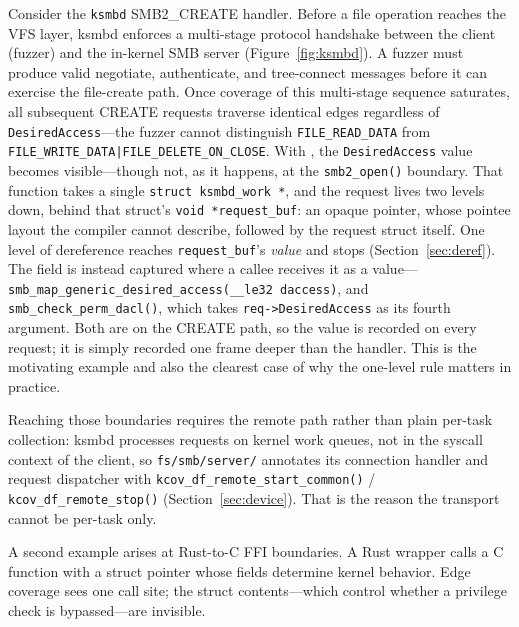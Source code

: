 \documentclass{article}
\begin{document}
Consider the \texttt{ksmbd} SMB2\_CREATE handler. Before a file operation
reaches the VFS layer, ksmbd enforces a multi-stage protocol handshake
between the client (fuzzer) and the in-kernel SMB server
(Figure~\ref{fig:ksmbd}). A fuzzer must produce valid negotiate, authenticate,
and tree-connect messages before it can exercise the file-create path. Once
coverage of this multi-stage sequence saturates, all subsequent CREATE requests
traverse identical edges regardless of \texttt{DesiredAccess}---the fuzzer
cannot distinguish \texttt{FILE\_READ\_DATA} from
\texttt{FILE\_WRITE\_DATA|FILE\_DELETE\_ON\_CLOSE}. With \toolname{}, the
\texttt{DesiredAccess} value becomes visible---though not, as it happens, at
the \texttt{smb2\_open()} boundary. That function takes a single
\texttt{struct ksmbd\_work *}, and the request lives two levels down, behind
that struct's \texttt{void *request\_buf}: an opaque pointer, whose pointee
layout the compiler cannot describe, followed by the request struct itself.
One level of dereference reaches \texttt{request\_buf}'s \emph{value} and stops
(Section~\ref{sec:deref}). The field is instead captured where a callee
receives it as a value---\texttt{smb\_map\_generic\_desired\_access(\_\_le32
daccess)}, and \texttt{smb\_check\_perm\_dacl()}, which takes
\texttt{req->DesiredAccess} as its fourth argument. Both are on the CREATE
path, so the value is recorded on every request; it is simply recorded one
frame deeper than the handler. This is the motivating example and also the
clearest case of why the one-level rule matters in practice.

Reaching those boundaries requires the remote path rather than plain per-task
collection: ksmbd processes requests on kernel work queues, not in the syscall
context of the client, so \texttt{fs/smb/server/} annotates its connection
handler and request dispatcher with
\texttt{kcov\_df\_remote\_start\_common()} /
\texttt{kcov\_df\_remote\_stop()} (Section~\ref{sec:device}). That is the
reason the transport cannot be per-task only.

A second example arises at Rust-to-C FFI boundaries. A Rust wrapper calls a C
function with a struct pointer whose fields determine kernel behavior. Edge
coverage sees one call site; the struct contents---which control whether a
privilege check is bypassed---are invisible.
\end{document}

